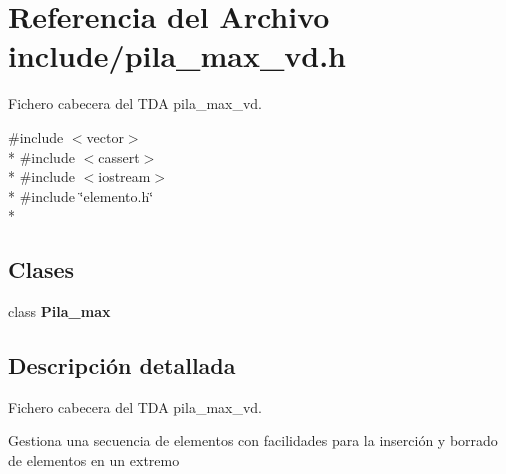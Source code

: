 \section{Referencia del Archivo include/pila\+\_\+max\+\_\+vd.h}
\label{pila__max__vd_8h}


Fichero cabecera del T\+DA pila\+\_\+max\+\_\+vd.  


{\ttfamily \#include $<$vector$>$}\\*
{\ttfamily \#include $<$cassert$>$}\\*
{\ttfamily \#include $<$iostream$>$}\\*
{\ttfamily \#include \char`\"{}elemento.\+h\char`\"{}}\\*
\subsection*{Clases}
\begin{DoxyCompactItemize}
\item 
class {\bf Pila\+\_\+max}
\end{DoxyCompactItemize}


\subsection{Descripción detallada}
Fichero cabecera del T\+DA pila\+\_\+max\+\_\+vd. 

Gestiona una secuencia de elementos con facilidades para la inserción y borrado de elementos en un extremo 
